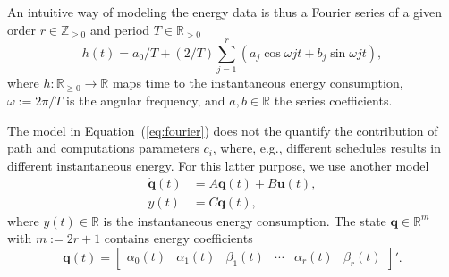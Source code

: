 \documentclass[letterpaper,10pt,journal,twoside]{IEEEtran}
\theoremstyle{definition}
\begin{document}



An intuitive way of modeling the energy data is thus a Fourier series of a given order $r\in\mathbb{Z}_{\geq 0}$ and period $T\in\mathbb{R}_{>0}$
\begin{equation}\label{eq:fourier}
  h(t)=a_0/T+(2/T)\sum_{j=1}^{r}{\left(a_j\cos{\omega jt}+b_j\sin{\omega jt}\right)},
\end{equation}
where $h:\mathbb{R}_{\geq 0}\rightarrow\mathbb{R}$ maps time to the instantaneous energy consumption, $\omega:=2\pi/T$ is the angular frequency, and $a,b\in\mathbb{R}$ the series coefficients.

The model in Equation~(\ref{eq:fourier}) does not the quantify the contribution of path and computations parameters $c_i$, where, e.g., different schedules results in different instantaneous energy. For this latter purpose, we use another model
\begin{subequations}\label{eq:state-perf}\begin{align}
  \dot{\mathbf{q}}(t)&=A\mathbf{q}(t)+B\mathbf{u}(t),\label{eq:state-perf-q}\\
  y(t)&=C\mathbf{q}(t),\label{eq:state-perf-y}
\end{align}\end{subequations}
where $y(t)\in\mathbb{R}$ is the instantaneous energy consumption. The state $\mathbf{q}\in\mathbb{R}^m$ with $m:=2r+1$ contains energy coefficients
\begin{equation}
  \mathbf{q}(t)=\begin{bmatrix}
    \alpha_0(t) & \alpha_1(t) & \beta_1(t) & \cdots & \alpha_r(t) & \beta_r(t)
  \end{bmatrix}'.
\end{equation}
\end{document}
